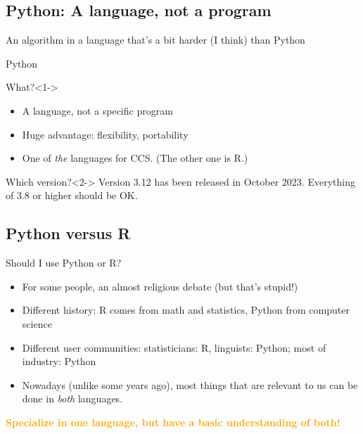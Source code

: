 \subsection{Python: A language, not a program}


\begin{frame}[plain]
	\footnotesize{An algorithm in a language that's a bit harder (I think) than Python}
\end{frame}



\begin{frame}{Python}
	\begin{block}{What?}<1->
		\begin{itemize}
			\item A language, not a specific program
			\item Huge advantage: flexibility, portability
			\item One of \emph{the} languages for CCS. \tiny{(The other one is R.)}
		\end{itemize}
	\end{block}
	
	\begin{block}{Which version?}<2->
          Version 3.12 has been released in October 2023. Everything of 3.8 or higher should be OK.  
	\end{block}
\end{frame}


\subsection{Python versus R}
\begin{frame}{Should I use Python or R?}
	\begin{itemize}
		\item For some people, an almost religious debate (but that's stupid!)
		\item Different history: R comes from math and statistics, Python from computer science
		\item Different user communities: statisticians: R, linguists: Python; most of industry: Python
		\item Nowadays (unlike some years ago), most things that are relevant to us can be done in \emph{both} languages.
	\end{itemize}
\pause
\textcolor{orange}{\textbf{Specialize in one language, but have a basic understanding of both!}}
\end{frame}


